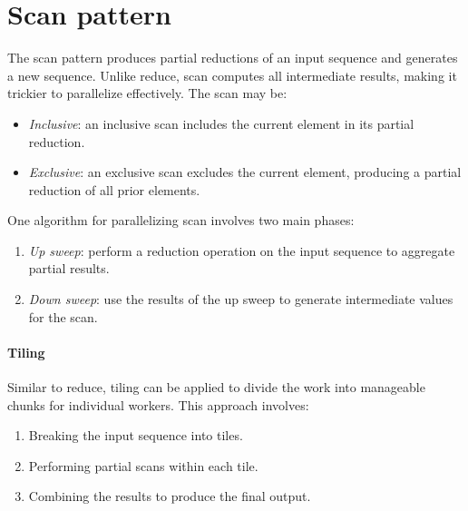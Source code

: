 \section{Scan pattern}

The scan pattern produces partial reductions of an input sequence and generates a new sequence. 
Unlike reduce, scan computes all intermediate results, making it trickier to parallelize effectively.
The scan may be: 
\begin{itemize}
    \item \textit{Inclusive}: an inclusive scan includes the current element in its partial reduction. 
    \item \textit{Exclusive}: an exclusive scan excludes the current element, producing a partial reduction of all prior elements.
\end{itemize}
One algorithm for parallelizing scan involves two main phases:
\begin{enumerate}
  \item \textit{Up sweep}: perform a reduction operation on the input sequence to aggregate partial results.
  \item \textit{Down sweep}: use the results of the up sweep to generate intermediate values for the scan.
\end{enumerate}

\paragraph*{Tiling}
Similar to reduce, tiling can be applied to divide the work into manageable chunks for individual workers. 
This approach involves:
\begin{enumerate}
  \item Breaking the input sequence into tiles.
  \item Performing partial scans within each tile.
  \item Combining the results to produce the final output.
\end{enumerate}